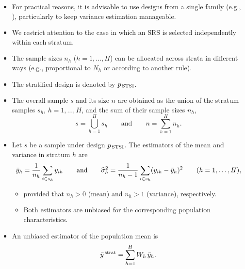 \documentclass{my_eth_beamer}
\numberwithin{equation}{section}
\begin{document}
\begin{frame}
    \begin{itemize}
    \setlength{\itemsep}{8pt}
        \item For \alert{practical reasons}, it is advisable to use designs
            from a single family (e.g., \SRS), particularly to keep variance
            estimation manageable.
        \item We \alert{restrict attention} to the case in which an \alert{SRS}
            is selected independently within each stratum.
        \item The \alert{sample sizes} $n_h$ ($h = 1, \ldots, H$) can be
            allocated across strata in \alert{different ways} (e.g.,
            proportional to $N_h$ or according to another rule).
        \item The stratified design is denoted by $p_{\,\mathrm{STSI}}$.
        \item The \alert{overall sample} $s$ and its size $n$ are obtained as
            the \alert{union} of the stratum samples $s_h$, $h = 1, \ldots, H$,
            and the sum of their sample sizes $n_h$,
            \begin{equation*}
                s = \bigcup_{h = 1}^H s_h \qquad \text{and}
                    \qquad n = \sum_{h = 1}^H n_h.
            \end{equation*}
    \end{itemize}
\end{frame}

\begin{frame}
    \begin{itemize}
    \setlength{\itemsep}{12pt}
        \item Let $s$ be a sample under design $p_{\,\mathrm{STSI}}$. The estimators
            of the \alert{mean} and \alert{variance} in stratum $h$ are
            \begin{equation*}
                \bar{y}_h = \frac{1}{n_h}\sum_{i \in s_h} y_{ih} \qquad \text{and}
                    \qquad \widehat{\sigma}_{h}^2 = \frac{1}{n_h - 1}\sum_{i \in s_h} (y_{ih}
                    - \bar{y}_h)^2 \qquad (h=1, \ldots,H),
            \end{equation*}
            \begin{itemize}
            \setlength{\itemsep}{12pt}
                \item \alert{provided} that $n_h > 0$ (mean) and $n_h > 1$
                    (variance), respectively.
                \item Both estimators are unbiased for the corresponding
                    population characteristics.
            \end{itemize}
        \item An unbiased \alert{estimator} of the \alert{population mean} is
            \begin{equation*}
                \bar{y}^{\, \mathrm{strat}} = \sum_{h = 1}^H W_h \, \bar{y}_h.
            \end{equation*}
    \end{itemize}
\end{frame}
\end{document}
